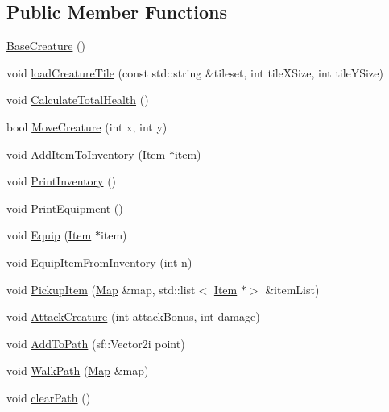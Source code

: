 \subsection*{Public Member Functions}
\begin{DoxyCompactItemize}
\item 
\mbox{\hyperlink{class_base_creature_aed503a9552a9d28233012f7a7b74d9bc}{Base\+Creature}} ()
\item 
void \mbox{\hyperlink{class_base_creature_af2066b8eb62bf595d30feae6671e4495}{load\+Creature\+Tile}} (const std\+::string \&tileset, int tile\+X\+Size, int tile\+Y\+Size)
\item 
void \mbox{\hyperlink{class_base_creature_ac5c9f52046801eb47701ef8b0f1eb32c}{Calculate\+Total\+Health}} ()
\item 
bool \mbox{\hyperlink{class_base_creature_a77f0a7d7c441406c252c3278817454d8}{Move\+Creature}} (int x, int y)
\item 
void \mbox{\hyperlink{class_base_creature_ab6f0139afb4e1b15d5f1feecc267580d}{Add\+Item\+To\+Inventory}} (\mbox{\hyperlink{class_item}{Item}} $\ast$item)
\item 
void \mbox{\hyperlink{class_base_creature_a097ec44d0b215f75ca75ae69c2bd11be}{Print\+Inventory}} ()
\item 
void \mbox{\hyperlink{class_base_creature_ac3d7907a8d8e0967a5881ff180205028}{Print\+Equipment}} ()
\item 
void \mbox{\hyperlink{class_base_creature_a82807038eafe46f7ac510a99a4cdc25e}{Equip}} (\mbox{\hyperlink{class_item}{Item}} $\ast$item)
\item 
void \mbox{\hyperlink{class_base_creature_a637cb7174d9bb9677a21281ff19fb10a}{Equip\+Item\+From\+Inventory}} (int n)
\item 
void \mbox{\hyperlink{class_base_creature_a2d45724079ff2eeb6606b222e405e4a8}{Pickup\+Item}} (\mbox{\hyperlink{class_map}{Map}} \&map, std\+::list$<$ \mbox{\hyperlink{class_item}{Item}} $\ast$$>$ \&item\+List)
\item 
void \mbox{\hyperlink{class_base_creature_a63f43a7153eee3c1032b02f6d1948cdb}{Attack\+Creature}} (int attack\+Bonus, int damage)
\item 
void \mbox{\hyperlink{class_base_creature_aa18f395754df39095f993e6805ef37a8}{Add\+To\+Path}} (sf\+::\+Vector2i point)
\item 
void \mbox{\hyperlink{class_base_creature_aaecab78bf5a5a5293079634e813f854f}{Walk\+Path}} (\mbox{\hyperlink{class_map}{Map}} \&map)
\item 
void \mbox{\hyperlink{class_base_creature_a8c7fec43bb0ca9a15e0f2596960283b7}{clear\+Path}} ()
$$
\end{DoxyCompactItemize}
